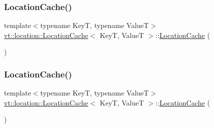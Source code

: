 \mbox{\label{structvt_1_1location_1_1_location_cache_a577179b586e3aa1a3d2b3c5dd6a10229}} 
\subsubsection{\texorpdfstring{Location\+Cache()}{LocationCache()}\hspace{0.1cm}{\footnotesize\ttfamily [2/3]}}
{\footnotesize\ttfamily template$<$typename KeyT, typename ValueT$>$ \\
\hyperlink{structvt_1_1location_1_1_location_cache}{vt\+::location\+::\+Location\+Cache}$<$ KeyT, ValueT $>$\+::\hyperlink{structvt_1_1location_1_1_location_cache}{Location\+Cache} (\begin{DoxyParamCaption}\item[{\hyperlink{structvt_1_1location_1_1_location_cache}{Location\+Cache}$<$ KeyT, ValueT $>$ const \&}]{ }\end{DoxyParamCaption})\hspace{0.3cm}{\ttfamily [delete]}}

\mbox{\label{structvt_1_1location_1_1_location_cache_a91afbec548074cb2fb55ed1c7f955803}} 
\subsubsection{\texorpdfstring{Location\+Cache()}{LocationCache()}\hspace{0.1cm}{\footnotesize\ttfamily [3/3]}}
{\footnotesize\ttfamily template$<$typename KeyT, typename ValueT$>$ \\
\hyperlink{structvt_1_1location_1_1_location_cache}{vt\+::location\+::\+Location\+Cache}$<$ KeyT, ValueT $>$\+::\hyperlink{structvt_1_1location_1_1_location_cache}{Location\+Cache} (\begin{DoxyParamCaption}\item[{\hyperlink{structvt_1_1location_1_1_location_cache}{Location\+Cache}$<$ KeyT, ValueT $>$ \&\&}]{ }\end{DoxyParamCaption})\hspace{0.3cm}{\ttfamily [delete]}}



